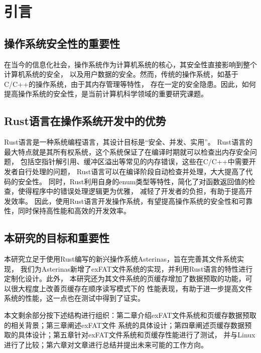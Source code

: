 
\chapter{引言}

\section{操作系统安全性的重要性}
在当今的信息化社会，操作系统作为计算机系统的核心，其安全性直接影响到整个计算机系统的安全，
以及用户数据的安全。然而，传统的操作系统，如基于C/C++的操作系统，由于其内存管理等特性，
存在一定的安全隐患。因此，如何提高操作系统的安全性，是当前计算机科学领域的重要研究课题。

\section{Rust语言在操作系统开发中的优势}
Rust语言是一种系统编程语言，其设计目标是“安全、并发、实用”。
Rust语言的最大特点就是其所有权系统，这个系统保证了在编译时期就可以检查出内存安全问题，
包括空指针解引用、缓冲区溢出等常见的内存错误，这些在C/C++中需要开发者自行处理的问题，
Rust语言可以在编译阶段自动检查并处理，大大提高了代码的安全性。
同时，Rust利用自身的enum类型等特性，简化了对函数返回值的检查，使得程序中的错误处理逻辑更为优雅，
减轻了开发者的负担，有助于提高开发效率。
因此，使用Rust语言开发操作系统，有望提高操作系统的安全性和可靠性，同时保持高性能和高效的开发效率。

\section{本研究的目标和重要性}
本研究立足于使用Rust编写的新兴操作系统Asterinas\parencite{Asterinas}，旨在完善其文件系统实现，
我们为Asterinas新增了exFAT文件系统\parencite{exFAT}的实现，并利用Rust语言的特性进行定制化设计。此外，
本研究还为其文件系统的页缓存增加了数据预取的功能，可以很大程度上改善页缓存在顺序读写模式下的
性能表现，有助于进一步提高文件系统的性能，这一点也在测试中得到了证实。

本文剩余部分按下述结构进行组织：第二章介绍exFAT文件系统和页缓存数据预取的相关背景；第三章阐述exFAT文件
系统的具体设计；第四章阐述页缓存数据预取的具体设计；第五章针对exFAT文件系统和页缓存性能进行了测试，
并与Linux进行了比较；第六章对文章进行总结并提出未来可能的工作方向。



